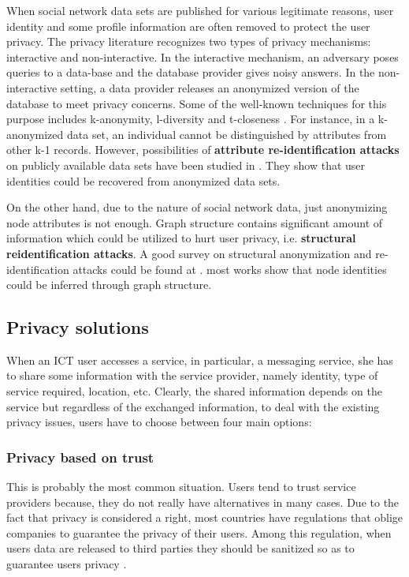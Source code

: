 When social network data sets are published for various legitimate reasons,
	user identity and some profile information are often removed to protect the user privacy.
The privacy literature recognizes two types of privacy mechanisms:
	interactive and non-interactive.
In the interactive mechanism,
	an adversary poses queries to a data-base and the database provider gives noisy answers.
In the non-interactive setting,
	a data provider releases an anonymized version of the database to meet privacy concerns.
Some of the well-known techniques for this purpose includes k-anonymity,
	l-diversity and t-closeness \cite{li_tcloseness_2017}.
For instance,
	in a k-anonymized data set,
	an individual cannot be distinguished by attributes from other k-1 records.
However,
	possibilities of \textbf{attribute re-identification attacks} on publicly available data sets have been studied in \cite{li_new_2014}.
They show that user identities could be recovered from anonymized data sets.

On the other hand,
	due to the nature of social network data,
	just anonymizing node attributes is not enough.
Graph structure contains significant amount of information which could be utilized to hurt user privacy,
	i.e. \textbf{structural reidentification attacks}.
A good survey on structural anonymization and re-identification attacks could be found at \cite{zhou_brief_2008}.
	most works show that node identities could be inferred through graph structure.

\subsection{Privacy solutions}

When an ICT user accesses a service,
	in particular,
	a messaging service,
	she has to share some information with the service provider,
	namely identity,
	type of service required,
	location,
	etc.
Clearly,
	the shared information depends on the service but regardless of the exchanged information,
	to deal with the existing privacy issues, users have to choose between four main options:

\subsubsection{Privacy based on trust}
This is probably the most common situation.
Users tend to trust service providers because,
	they do not really have alternatives in many cases.
Due to the fact that privacy is considered a right,
	most countries have regulations that oblige companies to guarantee the privacy of their users.
Among this regulation,
	when users data are released to third parties they should be sanitized so as to guarantee users privacy \cite{chen_privacypreserving_2009}.

